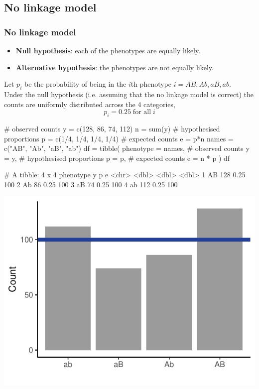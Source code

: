 \documentclass[a4paper]{article}\usepackage[]{graphicx}\usepackage[]{xcolor}
\makeatletter
\def\maxwidth{ %
  \ifdim\Gin@nat@width>\linewidth
    \linewidth
  \else
    \Gin@nat@width
  \fi
}
\makeatother
\begin{document}
\subsection{No linkage model}
\subsubsection{No linkage model}
\begin{itemize}
	\item \textbf{Null hypothesis}: each of the phenotypes are equally likely.
	\item \textbf{Alternative hypothesis}: the phenotypes are not equally likely.
\end{itemize}
Let \( p_i \) be the probability of being in the \( i \)th phenotype \( i = AB,Ab,aB,ab \).\\
Under the null hypothesis (i.e. assuming that the no linkage model is correct) the counts are uniformly distributed across the 4 categories,
\[
	p_i = 0.25 \;\text{for all}\; i
\]
\begin{Schunk}
\begin{Sinput}
# observed counts
y = c(128, 86, 74, 112) 
n = sum(y)
# hypothesised proportions
p = c(1/4, 1/4, 1/4, 1/4) 
# expected counts
e = p*n
names = c("AB", "Ab", "aB", "ab")
df = tibble(
  phenotype = names,
  # observed counts
  y = y,
  # hypothesised proportions
  p = p,
  # expected counts
  e = n * p
)
df
\end{Sinput}
\begin{Soutput}
# A tibble: 4 x 4
  phenotype     y     p     e
  <chr>     <dbl> <dbl> <dbl>
1 AB          128  0.25   100
2 Ab           86  0.25   100
3 aB           74  0.25   100
4 ab          112  0.25   100
\end{Soutput}


{\centering \includegraphics[width=\maxwidth]{figure/listings-unnamed-chunk-15-1} 

}

\end{Schunk}
\end{document}
